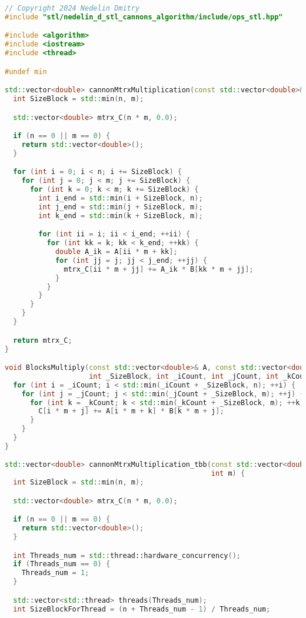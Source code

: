 \documentclass{report}
\begin{document}
\begin{lstlisting}[language=C++,caption=STL версия]
// Copyright 2024 Nedelin Dmitry
#include "stl/nedelin_d_stl_cannons_algorithm/include/ops_stl.hpp"

#include <algorithm>
#include <iostream>
#include <thread>

#undef min

std::vector<double> cannonMtrxMultiplication(const std::vector<double>& A, const std::vector<double>& B, int n, int m) {
  int SizeBlock = std::min(n, m);

  std::vector<double> mtrx_C(n * m, 0.0);

  if (n == 0 || m == 0) {
    return std::vector<double>();
  }

  for (int i = 0; i < n; i += SizeBlock) {
    for (int j = 0; j < m; j += SizeBlock) {
      for (int k = 0; k < m; k += SizeBlock) {
        int i_end = std::min(i + SizeBlock, n);
        int j_end = std::min(j + SizeBlock, m);
        int k_end = std::min(k + SizeBlock, m);

        for (int ii = i; ii < i_end; ++ii) {
          for (int kk = k; kk < k_end; ++kk) {
            double A_ik = A[ii * m + kk];
            for (int jj = j; jj < j_end; ++jj) {
              mtrx_C[ii * m + jj] += A_ik * B[kk * m + jj];
            }
          }
        }
      }
    }
  }

  return mtrx_C;
}

void BlocksMultiply(const std::vector<double>& A, const std::vector<double>& B, std::vector<double>& C, int n, int m,
                    int _SizeBlock, int _iCount, int _jCount, int _kCount) {
  for (int i = _iCount; i < std::min(_iCount + _SizeBlock, n); ++i) {
    for (int j = _jCount; j < std::min(_jCount + _SizeBlock, m); ++j) {
      for (int k = _kCount; k < std::min(_kCount + _SizeBlock, m); ++k) {
        C[i * m + j] += A[i * m + k] * B[k * m + j];
      }
    }
  }
}

std::vector<double> cannonMtrxMultiplication_tbb(const std::vector<double>& A, const std::vector<double>& B, int n,
                                                 int m) {
  int SizeBlock = std::min(n, m);

  std::vector<double> mtrx_C(n * m, 0.0);

  if (n == 0 || m == 0) {
    return std::vector<double>();
  }

  int Threads_num = std::thread::hardware_concurrency();
  if (Threads_num == 0) {
    Threads_num = 1;
  }

  std::vector<std::thread> threads(Threads_num);
  int SizeBlockForThread = (n + Threads_num - 1) / Threads_num;


\end{lstlisting}
\end{document}
